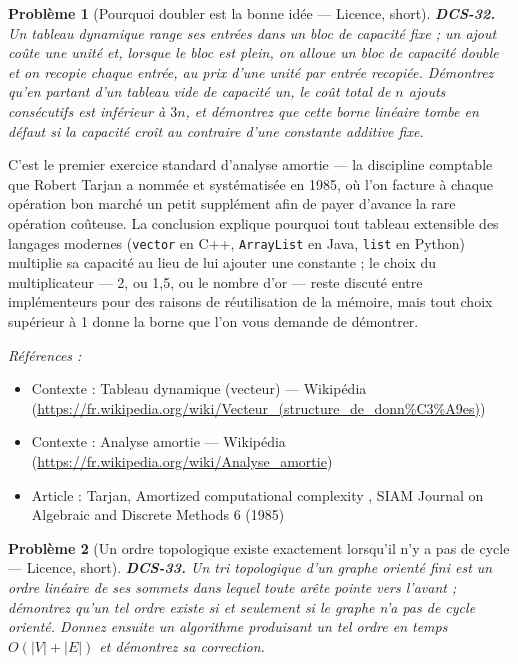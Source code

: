 \documentclass[11pt]{article}
\newtheorem{problem}{Problème}
\newenvironment{refs}{\par\small\noindent\emph{Références :}\begin{itemize}\setlength\itemsep{0pt}}{\end{itemize}\normalsize}
\begin{document}
\bigskip

\begin{problem}[{Pourquoi doubler est la bonne idée --- Licence, short}]
\textbf{DCS-32.} Un tableau dynamique range ses entrées dans un bloc de capacité fixe ; un ajout coûte une unité et, lorsque le bloc est plein, on alloue un bloc de capacité double et on recopie chaque entrée, au prix d'une unité par entrée recopiée. Démontrez qu'en partant d'un tableau vide de capacité un, le coût total de $n$ ajouts consécutifs est inférieur à $3n$, et démontrez que cette borne linéaire tombe en défaut si la capacité croît au contraire d'une constante additive fixe.
\end{problem}

\noindent C'est le premier exercice standard d'analyse amortie --- la discipline comptable que Robert Tarjan a nommée et systématisée en 1985, où l'on facture à chaque opération bon marché un petit supplément afin de payer d'avance la rare opération coûteuse. La conclusion explique pourquoi tout tableau extensible des langages modernes (\texttt{vector} en C++, \texttt{ArrayList} en Java, \texttt{list} en Python) multiplie sa capacité au lieu de lui ajouter une constante ; le choix du multiplicateur --- 2, ou 1,5, ou le nombre d'or --- reste discuté entre implémenteurs pour des raisons de réutilisation de la mémoire, mais tout choix supérieur à 1 donne la borne que l'on vous demande de démontrer.

\begin{refs}
\item Contexte : Tableau dynamique (vecteur) --- Wikipédia (\url{https://fr.wikipedia.org/wiki/Vecteur_(structure_de_donn%C3%A9es)})
\item Contexte : Analyse amortie --- Wikipédia (\url{https://fr.wikipedia.org/wiki/Analyse_amortie})
\item Article : Tarjan, \og{} Amortized computational complexity \fg{}, SIAM Journal on Algebraic and Discrete Methods 6 (1985)
\end{refs}

\bigskip

\begin{problem}[{Un ordre topologique existe exactement lorsqu'il n'y a pas de cycle --- Licence, short}]
\textbf{DCS-33.} Un \textit{tri topologique} d'un graphe orienté fini est un ordre linéaire de ses sommets dans lequel toute arête pointe vers l'avant ; démontrez qu'un tel ordre existe si et seulement si le graphe n'a pas de cycle orienté. Donnez ensuite un algorithme produisant un tel ordre en temps $O(|V| + |E|)$ et démontrez sa correction.
\end{problem}
\end{document}
